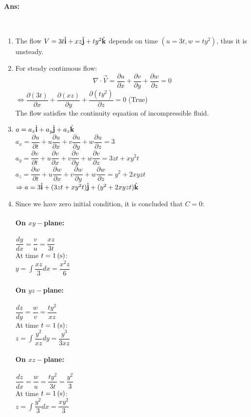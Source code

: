 \paragraph{Ans:}$  $
\begin{enumerate}
	\item The flow $ V = 3t\hat{\mathbf{i}} + xz\hat{\mathbf{j}} + ty^2\hat{\mathbf{k}} $ depends on time $( u=3t, w=ty^2) $, thus it is unsteady.
	\item For steady continuous flow:
	\[\nabla \cdot \vec{V}=\dfrac{\partial u}{\partial x} + \dfrac{\partial v}{\partial y} + \dfrac{\partial w}{\partial z}=0\]
	$ \Leftrightarrow \dfrac{\partial (3t)}{\partial x} + \dfrac{\partial (xz)}{\partial y} + \dfrac{\partial (ty^2)}{\partial z} =0$ (True)\\
	The flow satisfies the continuity equation of incompressible fluid.
	\item $ a=a_x\hat{\mathbf{i}}+a_y\hat{\mathbf{j}}+a_z\hat{\mathbf{k}} $\\
	$ a_x =  \dfrac{\partial u}{\partial t} +u \dfrac{\partial u}{\partial x} + v \dfrac{\partial u}{\partial y} + w \dfrac{\partial u}{\partial z} = 3$\\
	$ a_y =  \dfrac{\partial v}{\partial t} +u \dfrac{\partial v}{\partial x} + v \dfrac{\partial v}{\partial y} + w \dfrac{\partial v}{\partial z} = 3zt + xy^2t$\\
	$ a_z =  \dfrac{\partial w}{\partial t} +u \dfrac{\partial w}{\partial x} + v \dfrac{\partial w}{\partial y} + w \dfrac{\partial w}{\partial z} = y^2 + 2xyzt$\\
	$ \Rightarrow a = 3\hat{\mathbf{i}} + (3zt+xy^2t)\hat{\mathbf{j}} + (y^2 + 2xyzt)\hat{\mathbf{k}} $
	\item Since we have zero initial condition, it is concluded that $ C=0 $:
	\paragraph{On $ xy- $plane:}
	$ \dfrac{dy}{dx} = \dfrac{v}{u} = \dfrac{xz}{3t}$\\
	At time $ t=1\, (\mathrm{s}) $:\\
	$\displaystyle y=\int\dfrac{xz}{3}dx = \dfrac{x^2z}{6} $
	\paragraph{On $ yz- $plane:}
	$ \dfrac{dz}{dy} = \dfrac{w}{v} = \dfrac{ty^2}{xz}$\\
	At time $ t=1\, (\mathrm{s}) $:\\
	$\displaystyle z=\int\dfrac{y^2}{xz}dy = \dfrac{y^3}{3xz} $
	\paragraph{On $ xz- $plane:}
	$ \dfrac{dz}{dx} = \dfrac{w}{u} = \dfrac{ty^2}{3t}=\dfrac{y^2}{3}$\\
	At time $ t=1\, (\mathrm{s}) $:\\
	$\displaystyle z=\int\dfrac{y^2}{3}dx = \dfrac{xy^2}{3} $
\end{enumerate}

